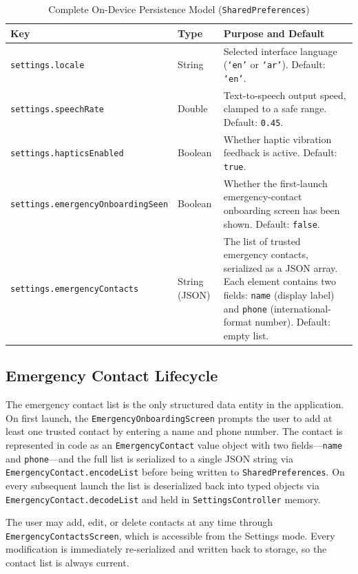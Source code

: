 \documentclass[a4paper]{report}
\begin{document}
\begin{table}[H]
\centering
\caption{Complete On-Device Persistence Model (\texttt{SharedPreferences})}
\label{tab:prefs-schema}
\begin{tabularx}{\textwidth}{|>{\raggedright\arraybackslash}p{}|>{\raggedright\arraybackslash}p{}|>{\raggedright\arraybackslash}X|}
\hline
\textbf{Key} & \textbf{Type} & \textbf{Purpose and Default} \\
\hline
\texttt{settings.locale} & String & Selected interface language (\texttt{`en'} or \texttt{`ar'}). Default: \texttt{`en'}. \\
\hline
\texttt{settings.speechRate} & Double & Text-to-speech output speed, clamped to a safe range. Default: \texttt{0.45}. \\
\hline
\texttt{settings.hapticsEnabled} & Boolean & Whether haptic vibration feedback is active. Default: \texttt{true}. \\
\hline
\texttt{settings.\allowbreak emergencyOnboardingSeen} & Boolean & Whether the first-launch emergency-contact onboarding screen has been shown. Default: \texttt{false}. \\
\hline
\texttt{settings.\allowbreak emergencyContacts} & String (JSON) & The list of trusted emergency contacts, serialized as a JSON array. Each element contains two fields: \texttt{name} (display label) and \texttt{phone} (international-format number). Default: empty list. \\
\hline
\end{tabularx}
\end{table}

\subsection{Emergency Contact Lifecycle}
The emergency contact list is the only structured data entity in the application. On first launch, the \texttt{EmergencyOnboardingScreen} prompts the user to add at least one trusted contact by entering a name and phone number. The contact is represented in code as an \texttt{EmergencyContact} value object with two fields---\texttt{name} and \texttt{phone}---and the full list is serialized to a single JSON string via \texttt{EmergencyContact.encodeList} before being written to \texttt{SharedPreferences}. On every subsequent launch the list is deserialized back into typed objects via \texttt{EmergencyContact.decodeList} and held in \texttt{SettingsController} memory.

The user may add, edit, or delete contacts at any time through \texttt{EmergencyContactsScreen}, which is accessible from the Settings mode. Every modification is immediately re-serialized and written back to storage, so the contact list is always current.
\end{document}
